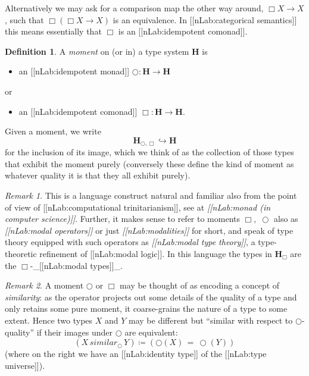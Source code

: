 \documentclass[12pt,titlepage]{article}
\theoremstyle{plain}
\theoremstyle{definition}
\newtheorem{defn}{Definition}
\theoremstyle{remark}
\newtheorem{remark}{Remark}
\begin{document}
Alternatively we may ask for a comparison map the other way around, $\Box X \longrightarrow X$, such that $\Box(\Box X \longrightarrow X)$ is an equivalence. In [[nLab:categorical semantics]] this means essentially that $\Box$ is an [[nLab:idempotent comonad]].
\begin{defn}
\label{Moments}\hypertarget{Moments}{}
A \emph{moment} on (or in) a type system $\mathbf{H}$ is
\begin{itemize}%
\item an [[nLab:idempotent monad]] $\bigcirc \colon \mathbf{H} \to \mathbf{H}$
\end{itemize}
or
\begin{itemize}%
\item an [[nLab:idempotent comonad]] $\Box \colon \mathbf{H} \to \mathbf{H}$.
\end{itemize}
Given a moment, we write
\begin{displaymath}
\mathbf{H}_{\bigcirc, \Box} \hookrightarrow \mathbf{H}
\end{displaymath}
for the inclusion of its image, which we think of as the collection of those types that exhibit the moment purely (conversely these define the kind of moment as whatever quality it is that they all exhibit purely).
\end{defn}
\begin{remark}
\label{}\hypertarget{}{}
This is a language construct natural and familiar also from the point of view of [[nLab:computational trinitarianism]], see at \emph{[[nLab:monad (in computer science)]]}.
Further, it makes sense to refer to moments $\Box,\;\bigcirc$ also as \emph{[[nLab:modal operators]]} or just \emph{[[nLab:modalities]]} for short, and speak of type theory equipped with such operators as \emph{[[nLab:modal type theory]]}, a type-theoretic refinement of [[nLab:modal logic]]. In this language the types in $\mathbf{H}_{\Box}$ are the $\Box$-\_[[nLab:modal types]]\_.
\end{remark}
\begin{remark}
\label{MomentsAndSimilarity}\hypertarget{MomentsAndSimilarity}{}
A moment $\bigcirc$ or $\Box$ may be thought of as encoding a concept of \emph{similarity}: as the operator projects out some details of the quality of a type and only retains some pure moment, it coarse-grains the nature of a type to some extent. Hence two types $X$ and $Y$ may be different but ``similar with respect to $\bigcirc$-quality'' if their images under $\bigcirc$ are equivalent:
\begin{displaymath}
(X \,similar_{\bigcirc}\, Y)
  \coloneqq
  (\bigcirc(X) \,= \, \bigcirc(Y))
\end{displaymath}
(where on the right we have an [[nLab:identity type]] of the [[nLab:type universe]]).
\end{remark}
\end{document}
